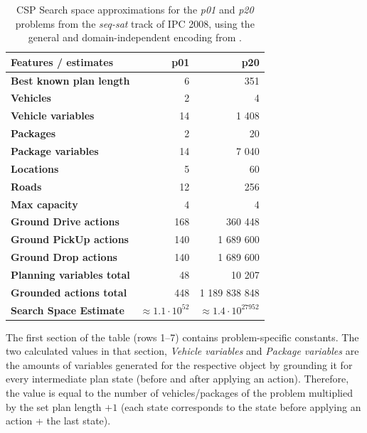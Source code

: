 \begin{table}[tb]
\begin{center}
\begin{tabular}{l||rr}
\textbf{Features / estimates} & \textbf{p01} & \textbf{p20} \\ 
\midrule
\midrule
\textbf{Best known plan length} & 6 & 351 \\ 
\textbf{Vehicles} & 2 & 4 \\ 
\textbf{Vehicle variables} & 14 & 1 408 \\ 
\textbf{Packages} & 2 & 20 \\ 
\textbf{Package variables} & 14 & 7 040 \\ 
\textbf{Locations} & 5 & 60 \\ 
\textbf{Roads} & 12 & 256 \\
\textbf{Max capacity} & 4 & 4 \\ 
\midrule
\textbf{Ground Drive actions} & 168 & 360 448 \\ 
\textbf{Ground PickUp actions} & 140 & 1 689 600 \\ 
\textbf{Ground Drop actions} & 140 & 1 689 600 \\ 
\midrule
\textbf{Planning variables total} & 48 & 10 207 \\ 
\textbf{Grounded actions total} & 448 & 1 189 838 848 \\ 
\textbf{Search Space Estimate} & $\approx 1.1 \cdot 10^{52}$ & $\approx 1.4 \cdot 10^{27 952}$ \\ %
\end{tabular}
\end{center}
\caption[Search space approximations for a na{\"{i}}ve CSP encoding.]{CSP Search space approximations for the \textit{p01} and \textit{p20} problems from the \textit{seq-sat} track of IPC 2008, using the general and domain-independent encoding from \citet[Section~8.3]{Ghallab2004}.}
\label{tab:csp-trivial}
\end{table}

The first section of the table (rows 1--7) contains problem-specific constants.
The two calculated values in that section, \textit{Vehicle variables} and \textit{Package variables} are the amounts of variables generated for the respective
object by grounding it for every intermediate plan state (before and after applying an action). Therefore, the value is equal to the number of vehicles/packages of the problem
multiplied by the set plan length $+ 1$ (each state corresponds to the state before applying an action + the last state).

